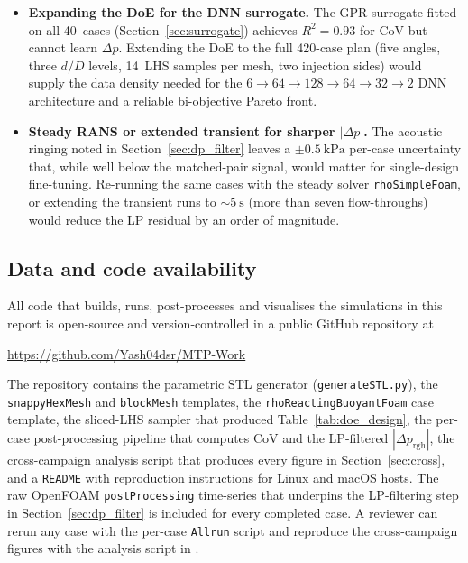 \documentclass[11pt,a4paper]{article}
\def\dD{d/D}%
\def\CoV{CoV}%
\newcommand{\dD}{\ensuremath{d/D}}
\newcommand{\CoV}{\ensuremath{\mathrm{CoV}}}
\begin{document}
\begin{itemize}
    \item \textbf{Expanding the DoE for the DNN surrogate.}\;
    The GPR surrogate fitted on all 40~cases
    (Section~\ref{sec:surrogate}) achieves \(R^{2}=0.93\) for
    \CoV{} but cannot learn \(\Delta p\).
    Extending the DoE to the full 420-case plan
    (five angles, three \(\dD\) levels, 14~LHS samples per mesh,
    two injection sides) would supply the data density needed for
    the \(6\!\to\!64\!\to\!128\!\to\!64\!\to\!32\!\to\!2\) DNN
    architecture and a reliable bi-objective Pareto front.
    \item \textbf{Steady RANS or extended transient for sharper
    \(|\Delta p|\).}\;
    The acoustic ringing noted in Section~\ref{sec:dp_filter}
    leaves a \(\pm\SI{0.5}{\kilo\pascal}\) per-case uncertainty
    that, while well below the matched-pair signal, would matter
    for single-design fine-tuning.
    Re-running the same cases with the steady solver
    \texttt{rhoSimpleFoam}, or extending the transient runs to
    \(\sim\SI{5}{\second}\) (more than seven flow-throughs) would
    reduce the LP residual by an order of magnitude.
\end{itemize}

\subsection{Data and code availability}
\label{sec:data_avail}
All code that builds, runs, post-processes and visualises the
simulations in this report is open-source and version-controlled
in a public GitHub repository at
\begin{center}
\url{https://github.com/Yash04dsr/MTP-Work}
\end{center}
The repository contains the parametric STL generator
(\texttt{generateSTL.py}), the \texttt{snappyHexMesh} and
\texttt{blockMesh} templates, the \texttt{rhoReactingBuoyantFoam}
case template, the sliced-LHS sampler that produced
Table~\ref{tab:doe_design}, the per-case post-processing
pipeline that computes \CoV{} and the LP-filtered
\(|\Delta p_{\mathrm{rgh}}|\), the cross-campaign analysis script
that produces every figure in Section~\ref{sec:cross}, and a
\texttt{README} with reproduction instructions for Linux and
macOS hosts. The raw OpenFOAM \texttt{postProcessing} time-series
that underpins the LP-filtering step in
Section~\ref{sec:dp_filter} is included for every completed case.
A reviewer can rerun any case with the per-case \texttt{Allrun}
script and reproduce the cross-campaign figures with the analysis
script in .
\end{document}
